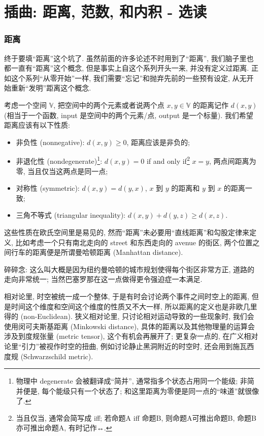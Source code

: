 \section{插曲: 距离, 范数, 和内积 -
选读}

\subsubsection{距离}

终于要填``距离''这个坑了. 虽然前面的许多论述不时用到了``距离'',
我们脑子里也都一直有``距离''这个概念, 但是事实上自这个系列开头一来,
并没有定义过距离. 正如这个系列``从零开始''一样,
我们需要``忘记''和抛弃先前的一些预有设定,
从无开始重新``发明''距离这个概念.

考虑一个空间 \(\mathbb{V}\), 把空间中的两个元素或者说两个点
\(x,y\in\mathbb{V}\) 的距离记作 \(d(x,y)\) (相当于一个函数, input
是空间中的两个元素/点, output 是一个标量). 我们希望距离应该有以下性质:

\begin{itemize}

\item
  非负性 (nonnegative): \(d(x,y)\ge0\), 距离应该是非负的;
\item
  非退化性 (nondegenerate)\footnote{物理中 degenerate
    会被翻译成``简并'', 通常指多个状态占用同一个能级; 非简并便是,
    每个能级只有一个状态了; 和这里距离为零便是同一点的``味道''就很像了.}:
  \(d(x,y)=0\) if and only if\footnote{当且仅当, 通常会简写成 iff;
    若命题A iff 命题B, 则命题A可推出命题B, 命题B亦可推出命题A,
    有时记作↔️.} \(x=y\), 两点间距离为零, 当且仅当这两点是同一点;
\item
  对称性 (symmetric): \(d(x,y)=d(y,x)\), \(x\) 到 \(y\) 的距离和 \(y\)
  到 \(x\) 的距离一致;
\item
  三角不等式 (triangular inequality): \(d(x,y)+d(y,z)\ge d(x,z)\).
\end{itemize}

这些性质在欧氏空间里是易见的,
然而``距离''未必要用``直线距离''和勾股定律来定义,
比如考虑一个只有南北走向的 street 和东西走向的 avenue 的街区,
两个位置之间行车的距离便是所谓曼哈顿距离 (Manhattan distance).

\begin{newquote}
碎碎念: 这么叫大概是因为纽约曼哈顿的城市规划使得每个街区非常方正,
道路的走向非常统一; 当然巴塞罗那在这一点做得更令强迫症一本满足.

相对论里, 时空被统一成一个整体, 于是有时会讨论两个事件之间时空上的距离,
但是时间这个维度和空间这个维度的性质又不大一样,
所以距离的定义也是非欧几里得的 (non-Euclidean). 狭义相对论里,
只讨论相对运动导致的一些现象时, 我们会使用闵可夫斯基距离 (Minkowski
distance), 具体的距离以及其他物理量的运算会涉及到度规张量 (metric
tensor), 这个有机会再展开了; 更复杂一点的,
在广义相对论里``引力''被视作时空的扭曲, 例如讨论静止黑洞附近的时空时,
还会用到施瓦西度规 (Schwarzschild metric).
\end{newquote}

